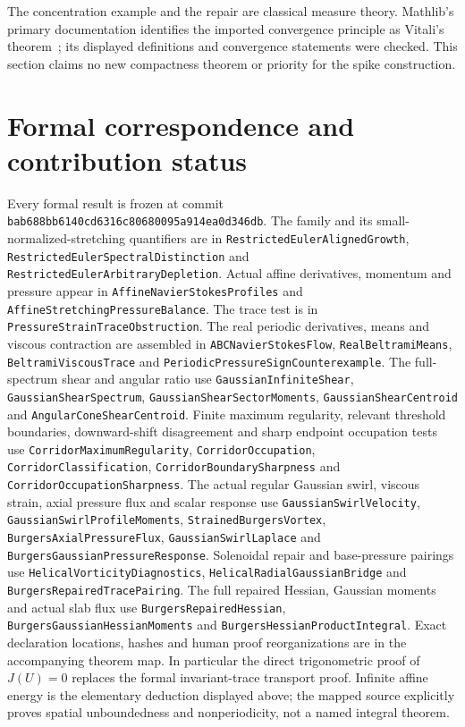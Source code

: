 \documentclass[11pt]{article}
\newcommand{\code}[1]{{\small\nolinkurl{#1}}}
\begin{document}
The concentration example and the repair are classical measure theory.
Mathlib's primary documentation identifies the imported convergence
principle as Vitali's theorem~\cite{MathlibUI}; its displayed definitions
and convergence statements were checked. This section claims no new
compactness theorem or priority for the spike construction.

\section{Formal correspondence and contribution status}
\begingroup\raggedright
Every formal result is frozen at commit
\code{bab688bb6140cd6316c80680095a914ea0d346db}.
The family and its small-normalized-stretching quantifiers are in
\code{RestrictedEulerAlignedGrowth},
\code{RestrictedEulerSpectralDistinction} and
\code{RestrictedEulerArbitraryDepletion}. Actual affine derivatives,
momentum and pressure appear in \code{AffineNavierStokesProfiles} and
\code{AffineStretchingPressureBalance}. The trace test is in
\code{PressureStrainTraceObstruction}. The real periodic derivatives,
means and viscous contraction are assembled in
\code{ABCNavierStokesFlow}, \code{RealBeltramiMeans},
\code{BeltramiViscousTrace} and \code{PeriodicPressureSignCounterexample}.
The full-spectrum shear and angular ratio use
\code{GaussianInfiniteShear}, \code{GaussianShearSpectrum},
\code{GaussianShearSectorMoments}, \code{GaussianShearCentroid} and
\code{AngularConeShearCentroid}. Finite maximum regularity, relevant
threshold boundaries, downward-shift disagreement and sharp endpoint
occupation tests use \code{CorridorMaximumRegularity},
\code{CorridorOccupation}, \code{CorridorClassification},
\code{CorridorBoundarySharpness} and \code{CorridorOccupationSharpness}.
The actual regular Gaussian swirl, viscous strain, axial pressure flux and scalar response use \code{GaussianSwirlVelocity}, \code{GaussianSwirlProfileMoments}, \code{StrainedBurgersVortex}, \code{BurgersAxialPressureFlux}, \code{GaussianSwirlLaplace} and \code{BurgersGaussianPressureResponse}. Solenoidal repair and base-pressure pairings use \code{HelicalVorticityDiagnostics}, \code{HelicalRadialGaussianBridge} and \code{BurgersRepairedTracePairing}. The full repaired Hessian, Gaussian moments and actual slab flux use \code{BurgersRepairedHessian}, \code{BurgersGaussianHessianMoments} and \code{BurgersHessianProductIntegral}. Exact declaration locations, hashes and human proof reorganizations
are in the accompanying theorem map. In particular the direct
trigonometric proof of $J(U)=0$ replaces the formal invariant-trace
transport proof. Infinite affine energy is the elementary deduction
displayed above; the mapped source explicitly proves spatial
unboundedness and nonperiodicity, not a named integral theorem.
\end{document}
